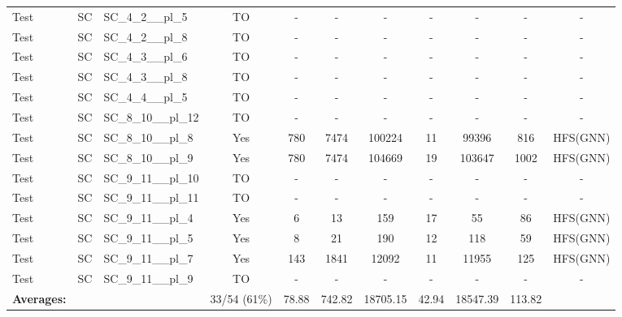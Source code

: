 \documentclass{article}
\begin{document}
\begin{tabular}{lllcccccccc}
Test & SC & SC\_4\_2\_\_pl\_5 & TO & - & - & - & - & - & - & - \\
Test & SC & SC\_4\_2\_\_pl\_8 & TO & - & - & - & - & - & - & - \\
Test & SC & SC\_4\_3\_\_pl\_6 & TO & - & - & - & - & - & - & - \\
Test & SC & SC\_4\_3\_\_pl\_8 & TO & - & - & - & - & - & - & - \\
Test & SC & SC\_4\_4\_\_pl\_5 & TO & - & - & - & - & - & - & - \\
Test & SC & SC\_8\_10\_\_pl\_12 & TO & - & - & - & - & - & - & - \\
Test & SC & SC\_8\_10\_\_pl\_8 & Yes & 780 & 7474 & 100224 & 11 & 99396 & 816 & HFS(GNN) \\
Test & SC & SC\_8\_10\_\_pl\_9 & Yes & 780 & 7474 & 104669 & 19 & 103647 & 1002 & HFS(GNN) \\
Test & SC & SC\_9\_11\_\_pl\_10 & TO & - & - & - & - & - & - & - \\
Test & SC & SC\_9\_11\_\_pl\_11 & TO & - & - & - & - & - & - & - \\
Test & SC & SC\_9\_11\_\_pl\_4 & Yes & 6 & 13 & 159 & 17 & 55 & 86 & HFS(GNN) \\
Test & SC & SC\_9\_11\_\_pl\_5 & Yes & 8 & 21 & 190 & 12 & 118 & 59 & HFS(GNN) \\
Test & SC & SC\_9\_11\_\_pl\_7 & Yes & 143 & 1841 & 12092 & 11 & 11955 & 125 & HFS(GNN) \\
Test & SC & SC\_9\_11\_\_pl\_9 & TO & - & - & - & - & - & - & - \\
\textbf{Averages:} & & & 33/54 (61\%) & 78.88 & 742.82 & 18705.15 & 42.94 & 18547.39 & 113.82 & \\
\bottomrule
\end{tabular}
\newpage
\end{document}
